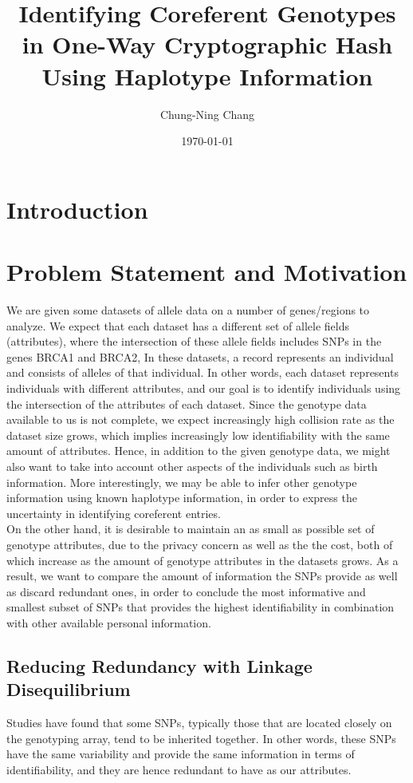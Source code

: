 \documentclass[14pt, oneside]{article}   	%
\title{Identifying Coreferent Genotypes in One-Way Cryptographic Hash Using Haplotype Information}
\author{Chung-Ning Chang}
\date{\today}							%
\begin{document}
\maketitle

\section{Introduction}

\section{Problem Statement and Motivation}
We are given some datasets of allele data on a number of genes/regions to analyze.
We expect that each dataset has a different set of allele fields (attributes),
where the intersection of these allele fields includes SNPs in the genes BRCA1 and BRCA2,
In these datasets, a record represents an individual and consists of alleles of that individual.
In other words, each dataset represents individuals with different attributes,
and our goal is to identify individuals using the intersection of the attributes of each dataset. 
Since the genotype data available to us is not complete, we expect increasingly high collision rate as the dataset size grows,
which implies increasingly low identifiability with the same amount of attributes.
Hence, in addition to the given genotype data, we might also want to take into account other aspects of the individuals such as birth information.
More interestingly, we may be able to infer other genotype information using known haplotype information,
in order to express the uncertainty in identifying coreferent entries.
\\
%
On the other hand, it is desirable to maintain an as small as possible set of genotype attributes,
due to the privacy concern as well as the the cost,
both of which increase as the amount of genotype attributes in the datasets grows.
As a result, we want to compare the amount of information the SNPs provide as well as discard redundant ones,
in order to conclude the most informative and smallest subset of SNPs that provides the highest identifiability in combination with other available personal information.
\\
%
\subsection{Reducing Redundancy with Linkage Disequilibrium}
Studies have found that some SNPs, typically those that are located closely on the genotyping array, tend to be inherited together.
In other words, these SNPs have the same variability and provide the same information in terms of identifiability,
and they are hence redundant to have as our attributes.
\end{document}
